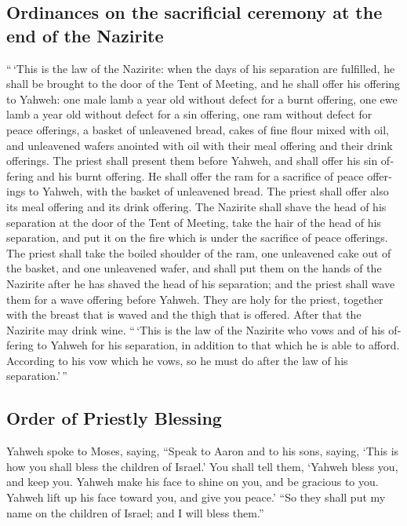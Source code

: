 \begin{paracol}{2}
\begin{otherlanguage}{english}
\hypertarget{ordinances-on-the-sacrificial-ceremony-at-the-end-of-the-nazirite}{%
\subsection{Ordinances on the sacrificial ceremony at the end of the
Nazirite}\label{ordinances-on-the-sacrificial-ceremony-at-the-end-of-the-nazirite}}

 ``\,`This is the law of the Nazirite: when the days of
his separation are fulfilled, he shall be brought to the door of the
Tent of Meeting,  and he shall offer his offering to
Yahweh: one male lamb a year old without defect for a burnt offering,
one ewe lamb a year old without defect for a sin offering, one ram
without defect for peace offerings,  a basket of
unleavened bread, cakes of fine flour mixed with oil, and unleavened
wafers anointed with oil with their meal offering and their drink
offerings.  The priest shall present them before Yahweh,
and shall offer his sin offering and his burnt offering. 
He shall offer the ram for a sacrifice of peace offerings to Yahweh,
with the basket of unleavened bread. The priest shall offer also its
meal offering and its drink offering.  The Nazirite shall
shave the head of his separation at the door of the Tent of Meeting,
take the hair of the head of his separation, and put it on the fire
which is under the sacrifice of peace offerings.  The
priest shall take the boiled shoulder of the ram, one unleavened cake
out of the basket, and one unleavened wafer, and shall put them on the
hands of the Nazirite after he has shaved the head of his separation;
 and the priest shall wave them for a wave offering
before Yahweh. They are holy for the priest, together with the breast
that is waved and the thigh that is offered. After that the Nazirite may
drink wine.  ``\,`This is the law of the Nazirite who
vows and of his offering to Yahweh for his separation, in addition to
that which he is able to afford. According to his vow which he vows, so
he must do after the law of his separation.'\,''

\hypertarget{order-of-priestly-blessing}{%
\subsection{Order of Priestly
Blessing}\label{order-of-priestly-blessing}}

 Yahweh spoke to Moses, saying,  ``Speak
to Aaron and to his sons, saying, `This is how you shall bless the
children of Israel.' You shall tell them,  `Yahweh bless
you, and keep you.  Yahweh make his face to shine on you,
and be gracious to you.  Yahweh lift up his face toward
you, and give you peace.'  ``So they shall put my name on
the children of Israel; and I will bless them.''


\end{otherlanguage}
\end{paracol}
